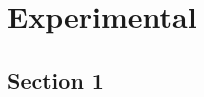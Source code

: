 \documentclass[Thesis.tex]{subfiles}
\begin{document}
\newpage
\doublespacing  %
\setcounter{chapter}{1} %


  
\thispagestyle{empty}


\chapter{Experimental}\label{chap2:Background}
\section{Section 1}
\lipsum[1]
\end{document}
